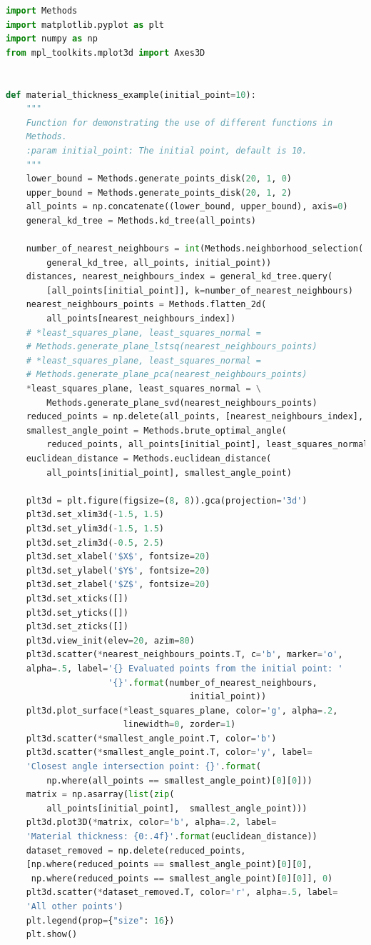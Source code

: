 \documentclass[%
]{USN-MSc}
\begin{document}
\begin{lstlisting}[language=Python, caption=Material thickness example use of Methods, label={lst:viz}]
import Methods
import matplotlib.pyplot as plt
import numpy as np
from mpl_toolkits.mplot3d import Axes3D


def material_thickness_example(initial_point=10):
    """
    Function for demonstrating the use of different functions in
    Methods.
    :param initial_point: The initial point, default is 10.
    """
    lower_bound = Methods.generate_points_disk(20, 1, 0)
    upper_bound = Methods.generate_points_disk(20, 1, 2)
    all_points = np.concatenate((lower_bound, upper_bound), axis=0)
    general_kd_tree = Methods.kd_tree(all_points)

    number_of_nearest_neighbours = int(Methods.neighborhood_selection(
        general_kd_tree, all_points, initial_point))
    distances, nearest_neighbours_index = general_kd_tree.query(
        [all_points[initial_point]], k=number_of_nearest_neighbours)
    nearest_neighbours_points = Methods.flatten_2d(
        all_points[nearest_neighbours_index])
    # *least_squares_plane, least_squares_normal =
    # Methods.generate_plane_lstsq(nearest_neighbours_points)
    # *least_squares_plane, least_squares_normal =
    # Methods.generate_plane_pca(nearest_neighbours_points)
    *least_squares_plane, least_squares_normal = \
        Methods.generate_plane_svd(nearest_neighbours_points)
    reduced_points = np.delete(all_points, [nearest_neighbours_index], 0)
    smallest_angle_point = Methods.brute_optimal_angle(
        reduced_points, all_points[initial_point], least_squares_normal)
    euclidean_distance = Methods.euclidean_distance(
        all_points[initial_point], smallest_angle_point)

    plt3d = plt.figure(figsize=(8, 8)).gca(projection='3d')
    plt3d.set_xlim3d(-1.5, 1.5)
    plt3d.set_ylim3d(-1.5, 1.5)
    plt3d.set_zlim3d(-0.5, 2.5)
    plt3d.set_xlabel('$X$', fontsize=20)
    plt3d.set_ylabel('$Y$', fontsize=20)
    plt3d.set_zlabel('$Z$', fontsize=20)
    plt3d.set_xticks([])
    plt3d.set_yticks([])
    plt3d.set_zticks([])
    plt3d.view_init(elev=20, azim=80)
    plt3d.scatter(*nearest_neighbours_points.T, c='b', marker='o',
    alpha=.5, label='{} Evaluated points from the initial point: '
                    '{}'.format(number_of_nearest_neighbours,
                                    initial_point))
    plt3d.plot_surface(*least_squares_plane, color='g', alpha=.2,
                       linewidth=0, zorder=1)
    plt3d.scatter(*smallest_angle_point.T, color='b')
    plt3d.scatter(*smallest_angle_point.T, color='y', label=
    'Closest angle intersection point: {}'.format(
        np.where(all_points == smallest_angle_point)[0][0]))
    matrix = np.asarray(list(zip(
        all_points[initial_point],  smallest_angle_point)))
    plt3d.plot3D(*matrix, color='b', alpha=.2, label=
    'Material thickness: {0:.4f}'.format(euclidean_distance))
    dataset_removed = np.delete(reduced_points,
    [np.where(reduced_points == smallest_angle_point)[0][0],
     np.where(reduced_points == smallest_angle_point)[0][0]], 0)
    plt3d.scatter(*dataset_removed.T, color='r', alpha=.5, label=
    'All other points')
    plt.legend(prop={"size": 16})
    plt.show()



\end{lstlisting}
\end{document}
